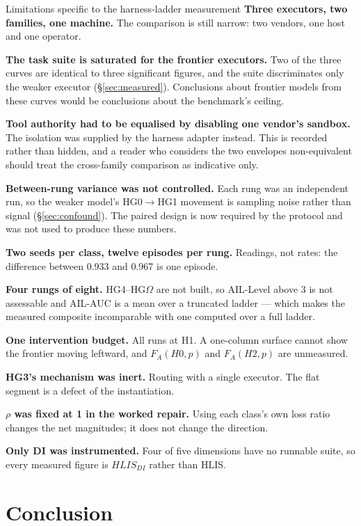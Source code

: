 \documentclass[11pt]{article}
\theoremstyle{definition}
\newcommand{\Om}{\ensuremath{\Omega}}
\begin{document}
\begin{cautionbox}{Limitations specific to the harness-ladder measurement}
\textbf{Three executors, two families, one machine.} The comparison is still narrow: two vendors, one host and one operator.

\textbf{The task suite is saturated for the frontier executors.} Two of the three curves are identical to three significant figures, and the suite discriminates only the weaker executor (\S\ref{sec:measured}). Conclusions about frontier models from these curves would be conclusions about the benchmark's ceiling.

\textbf{Tool authority had to be equalised by disabling one vendor's sandbox.} The isolation was supplied by the harness adapter instead. This is recorded rather than hidden, and a reader who considers the two envelopes non-equivalent should treat the cross-family comparison as indicative only.

\textbf{Between-rung variance was not controlled.} Each rung was an independent run, so the weaker model's HG0$\to$HG1 movement is sampling noise rather than signal (\S\ref{sec:confound}). The paired design is now required by the protocol and was not used to produce these numbers.

\textbf{Two seeds per class, twelve episodes per rung.} Readings, not rates: the difference between 0.933 and 0.967 is one episode.

\textbf{Four rungs of eight.} HG4--HG\Om{} are not built, so AIL-Level above 3 is not assessable and AIL-AUC is a mean over a truncated ladder --- which makes the measured composite incomparable with one computed over a full ladder.

\textbf{One intervention budget.} All runs at H1. A one-column surface cannot show the frontier moving leftward, and $F_A(H0,p)$ and $F_A(H2,p)$ are unmeasured.

\textbf{HG3's mechanism was inert.} Routing with a single executor. The flat segment is a defect of the instantiation.

\textbf{$\rho$ was fixed at 1 in the worked repair.} Using each class's own loss ratio changes the net magnitudes; it does not change the direction.

\textbf{Only DI was instrumented.} Four of five dimensions have no runnable suite, so every measured figure is $HLIS_{DI}$ rather than HLIS.
\end{cautionbox}

\section{Conclusion}
\end{document}
